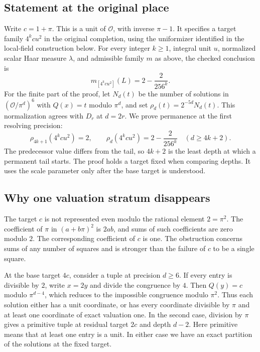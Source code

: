 \documentclass[12pt,letterpaper]{article}
\begin{document}
\subsection{Statement at the original place}
Write $c=1+\pi$. This is a unit of $\mathcal O$, with inverse $\pi-1$. It specifies a target family $4^kcu^2$ in the original completion, using the uniformizer identified in the local-field construction below. For every integer $k\geq 1$, integral unit $u$, normalized scalar Haar measure $\lambda$, and admissible family $m$ as above, the checked conclusion is
\begin{equation}
  m_{[4^kcu^2]}(L)=2-\frac{2}{256^k}.
  \label{eq:companion-mass}
\end{equation}
For the finite part of the proof, let $N_d(t)$ be the number of solutions in $(\mathcal O/\pi^d)^6$ with $Q(x)=t$ modulo $\pi^d$, and set $\rho_d(t)=2^{-5d}N_d(t)$. This normalization agrees with $D_r$ at $d=2r$. We prove permanence at the first resolving precision:
\[
  \rho_{4k+1}(4^kcu^2)=2,\qquad
  \rho_d(4^kcu^2)=2-\frac{2}{256^k}\quad(d\geq 4k+2).
\]
The predecessor value differs from the tail, so $4k+2$ is the least depth at which a permanent tail starts. The proof holds a target fixed when comparing depths. It uses the scale parameter only after the base target is understood.

\subsection{Why one valuation stratum disappears}
The target $c$ is not represented even modulo the rational element $2=\pi^2$. The coefficient of $\pi$ in $(a+b\pi)^2$ is $2ab$, and sums of such coefficients are zero modulo $2$. The corresponding coefficient of $c$ is one. The obstruction concerns sums of any number of squares and is stronger than the failure of $c$ to be a single square.

At the base target $4c$, consider a tuple at precision $d\geq 6$. If every entry is divisible by $2$, write $x=2y$ and divide the congruence by $4$. Then $Q(y)=c$ modulo $\pi^{d-4}$, which reduces to the impossible congruence modulo $\pi^2$. Thus each solution either has a unit coordinate, or has every coordinate divisible by $\pi$ and at least one coordinate of exact valuation one. In the second case, division by $\pi$ gives a primitive tuple at residual target $2c$ and depth $d-2$. Here primitive means that at least one entry is a unit. In either case we have an exact partition of the solutions at the fixed target.
\end{document}
